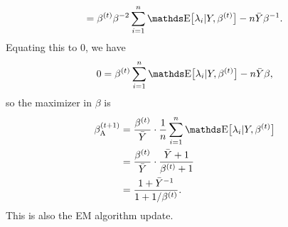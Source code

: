 \begin{enumerate}
\begin{enumerate}
\[        =
        \beta^{(t)}\beta^{-2}
        \sum_{i=1}^n \E\bigl[ \lambda_i \vert Y, \beta^{(t)} \bigr]
        - n\bar{Y}\beta^{-1}.
        \]
    Equating this to 0, we have
        \[
        0 
        = 
        \beta^{(t)} \sum_{i=1}^n \E\bigl[ \lambda_i \vert Y, \beta^{(t)} \bigr]
        - n\bar{Y}\beta,
        \]
    so the maximizer in $\beta$ is
        \begin{align} \label{eqn:aa}
        \notag
        \beta_\mathrm{A}^{(t+1)}
        &=
        \frac{\beta^{(t)}}{\bar{Y}} \cdot \frac{1}{n}
        \sum_{i=1}^n \E\bigl[ \lambda_i \vert Y, \beta^{(t)} \bigr]
        \\ &=\notag
        \frac{\beta^{(t)}}{\bar{Y}} \cdot 
        \frac{\bar{Y} + 1}{\beta^{(t)} + 1}
        \\ &=
        \frac{1 + \bar{Y}^{-1}}{1 + 1 / \beta^{(t)}}.
        \end{align}
    This is also the EM algorithm update.


\end{enumerate}
\end{enumerate}
